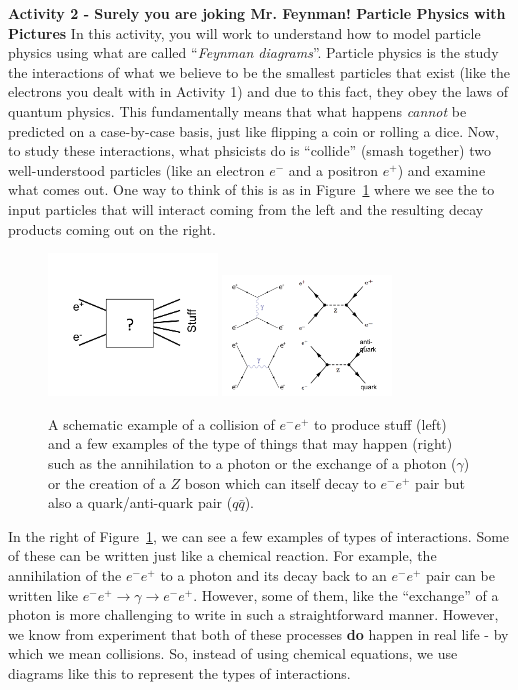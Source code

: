 \documentclass[12pt]{article}
\begin{document}
\newpage
\textbf{Activity 2 - Surely you are joking Mr. Feynman! Particle Physics with Pictures}
In this activity, you will work to understand how to model particle physics using what are called ``\textit{Feynman diagrams}''.  Particle physics is the study the interactions of what we believe to be the smallest particles that exist (like the electrons you dealt with in Activity 1) and due to this fact, they obey the laws of quantum physics.  This fundamentally means that what happens \textit{cannot} be predicted on a case-by-case basis, just like flipping a coin or rolling a dice.  Now, to study these interactions, what phsicists do is ``collide'' (smash together) two well-understood particles (like an electron $e^{-}$ and a positron $e^{+}$) and examine what comes out.  One way to think of this is as in Figure~\ref{fig:fd1} where we see the to input particles that will interact coming from the left and the resulting decay products coming out on the right.
\begin{figure}[!ht]
\centering
\includegraphics[width=0.4\textwidth]{fd1.png}
\includegraphics[width=0.4\textwidth]{fd2.png}
\caption{A schematic example of a collision of $e^{-}e^{+}$ to produce stuff (left) and a few examples of the type of things that may happen (right) such as the annihilation to a photon or the exchange of a photon ($\gamma$) or the creation of a $Z$ boson which can itself decay to $e^{-}e^{+}$ pair but also a quark/anti-quark pair ($q\bar{q}$).}
\label{fig:fd1}
\end{figure}
In the right of Figure~\ref{fig:fd1}, we can see a few examples of types of interactions.  Some of these can be written just like a chemical reaction.  For example, the annihilation of the $e^{-}e^{+}$ to a photon and its decay back to an $e^{-}e^{+}$ pair can be written like $e^{-}e^{+} \rightarrow \gamma \rightarrow e^{-}e^{+}$.  However, some of them, like the ``exchange'' of a photon is more challenging to write in such a straightforward manner.  However, we know from experiment that both of these processes \textbf{do} happen in real life - by which we mean collisions.  So, instead of using chemical equations, we use diagrams like this to represent the types of interactions.  
\end{document}

